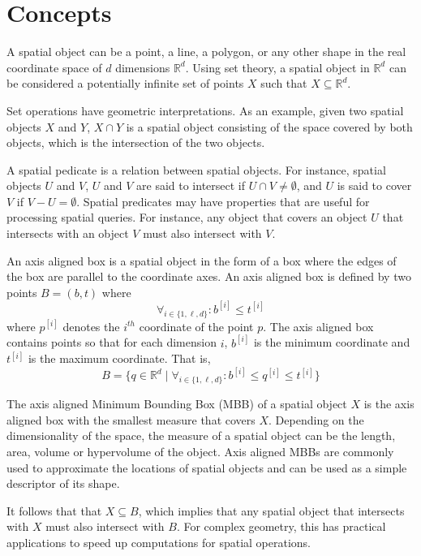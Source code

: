 \section{Concepts}

A spatial object can be a point, a line, a polygon, or any other shape in the real coordinate space of \(d\) dimensions \(\mathbb{R}^d\). Using set theory, a spatial object in \(\mathbb{R}^d\) can be considered a potentially infinite set of points \(X\) such that \(X \subseteq \mathbb{R}^d\).

Set operations have geometric interpretations. As an example, given two spatial objects \(X\) and \(Y\), \(X \cap Y\) is a spatial object consisting of the space covered by both objects, which is the intersection of the two objects.

A spatial pedicate is a relation between spatial objects. For instance, spatial objects \(U\) and \(V\), \(U\) and \(V\) are said to intersect if \(U \cap V \neq \emptyset\), and \(U\) is said to cover \(V\) if \(V - U = \emptyset\). Spatial predicates may have properties that are useful for processing spatial queries. For instance, any object that covers an object \(U\) that intersects with an object \(V\) must also intersect with \(V\).

An axis aligned box is a spatial object in the form of a box where the edges of the box are parallel to the coordinate axes. An axis aligned box is defined by two points \(B = (b, t)\) where
\[
  \forall_{i \in \{1, \ell, d\}} :
  b^{[i]} \leq t^{[i]}
\]
where \(p^{[i]}\) denotes the \(i^{th}\) coordinate of the point \(p\).
The axis aligned box contains points so that for each dimension \(i\), \(b^{[i]}\) is the minimum coordinate and \(t^{[i]}\) is the maximum coordinate. That is,
\[
  B = \{
    q \in \mathbb{R}^d \mid
    \forall_{i \in \{ 1, \ell, d \}} :
    b^{[i]} \leq q^{[i]} \leq t^{[i]}
  \}
\]

The axis aligned Minimum Bounding Box (MBB) of a spatial object \(X\) is the axis aligned box with the smallest measure that covers \(X\). Depending on the dimensionality of the space, the measure of a spatial object can be the length, area, volume or hypervolume of the object. Axis aligned MBBs are commonly used to approximate the locations of spatial objects and can be used as a simple descriptor of its shape.

It follows that that \(X \subseteq B\), which implies that any spatial object that intersects with \(X\) must also intersect with \(B\). For complex geometry, this has practical applications to speed up computations for spatial operations.

